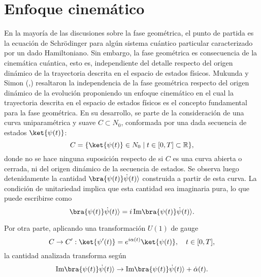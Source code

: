 \section{Enfoque cinemático}\label{sec2:cinematico}

En la mayoría de las discusiones sobre la fase geométrica, el punto de partida es la ecuación de Schrödinger para algún sistema cuántico particular caracterizado por un dado Hamiltoniano. Sin embargo, la fase geométrica es consecuencia de la cinemática cuántica, esto es, independiente del detalle respecto del origen dinámico de la trayectoria descrita en el espacio de estados físicos. Mukunda y Simon (\cite{Mukunda1993-1},\cite{Mukunda1993-2}) resaltaron la independencia de la fase geométrica respecto del origen dinámico de la evolución proponiendo un enfoque cinemático en el cual la trayectoria descrita en el espacio de estados físicos es el concepto fundamental para la fase geométrica. En su desarrollo, se parte de la consideración de una curva uniparamétrica y suave \( C \subset N_0 \), conformada por una dada secuencia de estados \( \ket{\psi(t)} \):
\begin{equation}
C = \{ \ket{\psi(t)} \in N_0 \mid t \in [0, T] \subset \mathbb{R} \},
\end{equation}
donde no se hace ninguna suposición respecto de si \( C \) es una curva abierta o cerrada, ni del origen dinámico de la secuencia de estados. Se observa luego detenidamente la cantidad \( \bra{\psi(t)} \dot{\psi}(t) \rangle \) construida a partir de esta curva. La condición de unitariedad implica que esta cantidad sea imaginaria pura, lo que puede escribirse como
\begin{equation}
\bra{\psi(t)} \dot{\psi}(t) \rangle = i \, \text{Im} \bra{\psi(t)} \dot{\psi}(t) \rangle.
\end{equation}

Por otra parte, aplicando una transformación \( U(1) \) de gauge
\begin{equation} \label{ec2:transformacion u1}
C \to C': \ket{\psi'(t)} = e^{i\alpha(t)} \ket{\psi(t)}, \quad t \in [0, T],
\end{equation}
la cantidad analizada transforma según
\begin{equation}
    \text{Im} \bra{\psi(t)} \dot{\psi}(t) \rangle \rightarrow  \text{Im} \bra{\psi(t)} \dot{\psi}(t) \rangle + \dot{\alpha}(t).
\end{equation}

